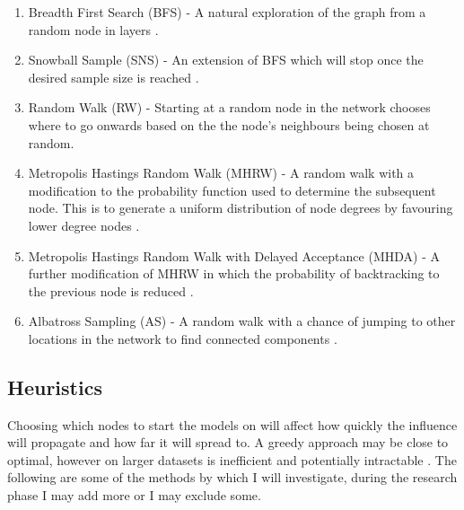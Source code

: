 \documentclass{article}
\begin{document}
\begin{enumerate}
	\item Breadth First Search (BFS) - A natural exploration of the graph from a random node in layers \cite{franks2014learning}.
	\item Snowball Sample (SNS) - An extension of BFS which will stop once the desired sample size is reached \cite{franks2014learning}.
	\item Random Walk (RW) - Starting at a random node in the network chooses where to go onwards based on the the node's neighbours being chosen at random.
	\item Metropolis Hastings Random Walk (MHRW) - A random walk with a modification to the probability function used to determine the subsequent node. This is to generate a uniform distribution of node degrees by favouring lower degree nodes \cite{gjoka11practicalreco}.
	\item Metropolis Hastings Random Walk with Delayed Acceptance (MHDA) - A further modification of MHRW in which the probability of backtracking to the previous node is reduced \cite{lee2012randomwalkmetropolishastingssamplers}.
	\item Albatross Sampling (AS) - A random walk with a chance of jumping to other locations in the network to find connected components \cite{jin2011albatross}.
\end{enumerate}

\subsection{Heuristics} \label{probDiscHeuristics}

Choosing which nodes to start the models on will affect how quickly the influence will propagate and how far it will spread to.
A greedy approach may be close to optimal, however on larger datasets is inefficient and potentially intractable \cite{griffiths17LimitiingConcept}.
The following are some of the methods by which I will investigate, during the research phase I may add more or I may exclude some.
\end{document}
